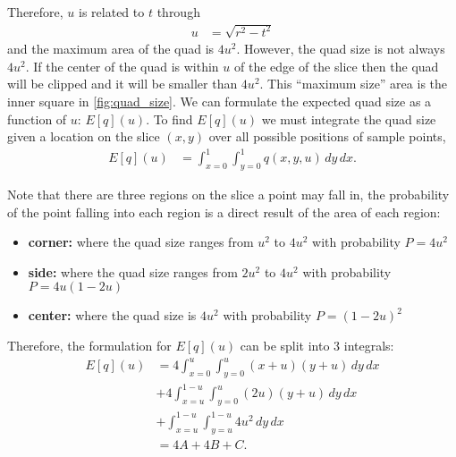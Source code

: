 Therefore, $u$ is related to $t$ through
\begin{align}
  u &= \sqrt{r^2-t^2} \label{eq:u_to_t}
\end{align}
and the
maximum area of the quad is $4u^2$.  However, the quad size is not always
$4u^2$.   If the center of the quad is within $u$ of the edge of the slice
then the quad will be clipped and it will be smaller than $4u^2$.
This ``maximum size'' area is the inner square in \autoref{fig:quad_size}.
We can formulate the expected quad size as a function of $u$: $E[q](u)$.
To find $E[q](u)$ we must integrate the quad size given a location on 
the slice $(x,y)$ over all possible positions of sample points,
\begin{align*}
  E[q](u) &= \int_{x=0}^1 \int_{y=0}^1 q(x, y, u) \, dy \, dx
  \text{.}
\end{align*}

Note that there are three regions on the slice a point may fall in,
the probability of the point falling into each region is a direct result
of the area of each region:

\begin{itemize}
\item \textbf{corner:} where the quad size ranges from $u^2$ to $4u^2$
                    with probability $P = 4u^2$
\item \textbf{side:}   where the quad size ranges from $2u^2$ to $4u^2$ 
                    with probability $P = 4u(1-2u)$
\item \textbf{center:} where the quad size is $4u^2$
                    with probability $P = (1-2u)^2$
\end{itemize}

Therefore, the formulation for $E[q](u)$ can be split into 3 integrals:
\begin{align*}
  E[q](u) &=   4 \int_{x=0}^u \int_{y=0}^u (x+u)(y+u) \, dy \, dx     \\
           & + 4 \int_{x=u}^{1-u} \int_{y=0}^u (2u)(y+u) \, dy \, dx \\
           & + \int_{x=u}^{1-u} \int_{y=u}^{1-u} 4u^2 \, dy \, dx    \\
          &= 4A + 4B + C
          \text{.}
\end{align*}


